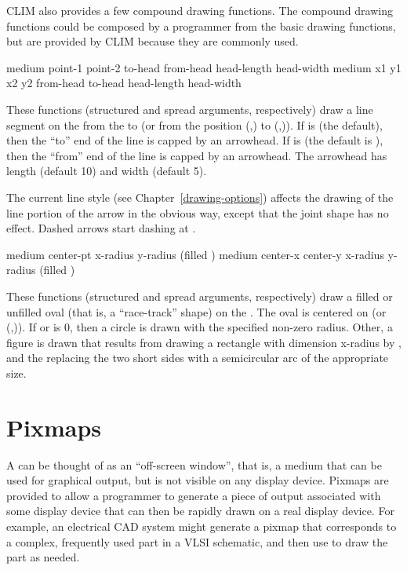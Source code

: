 CLIM also provides a few compound drawing functions.  The compound drawing
functions could be composed by a programmer from the basic drawing functions,
but are provided by CLIM because they are commonly used.

  {medium point-1 point-2 \key \DrawingOptions \LineCapOptions
                      to-head from-head head-length head-width}
 {medium x1 y1 x2 y2 \key \DrawingOptions \LineCapOptions
                      from-head to-head head-length head-width}

These functions (structured and spread arguments, respectively) draw a line
segment on the   from the   to
 (or from the position (,) to (,)).
If  is  (the default), then the ``to'' end of the line
is capped by an arrowhead.  If  is  (the default is
), then the ``from'' end of the line is capped by an arrowhead.  The
arrowhead has length  (default 10) and width 
(default 5).

The current line style (see Chapter~\ref{drawing-options}) affects the drawing
of the line portion of the arrow in the obvious way, except that the joint shape
has no effect.  Dashed arrows start dashing at .


  {medium center-pt x-radius y-radius \key (filled ) 
                     \DrawingOptions \LineCapOptions}
 {medium center-x center-y x-radius y-radius \key (filled )
                     \DrawingOptions \LineCapOptions}

These functions (structured and spread arguments, respectively) draw a filled or
unfilled oval (that is, a ``race-track'' shape) on the  .
The oval is centered on  (or (,)).
If  or  is $0$, then a circle is drawn with the
specified non-zero radius.  Other, a figure is drawn that results from drawing a
rectangle with dimension {x-radius} by , and the replacing the two
short sides with a semicircular arc of the appropriate size.


\section {Pixmaps}

A  can be thought of as an ``off-screen window'', that is, a
medium that can be used for graphical output, but is not visible on any display
device.   Pixmaps are provided to allow a programmer to generate a piece of
output associated with some display device that can then be rapidly drawn on a
real display device.  For example, an electrical CAD system might generate a
pixmap that corresponds to a complex, frequently used part in a VLSI schematic,
and then use  to draw the part as needed.

